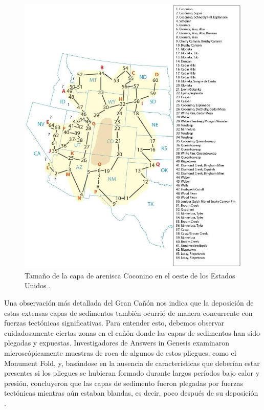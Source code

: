\documentclass[10pt,twocolumn,letterpaper]{article}
\begin{document}
\begin{figure}[t]

\begin{center}
   \includegraphics[width=1\linewidth]{coconino.jpg}
\end{center}
   \caption{Tamaño de la capa de arenisca Coconino en el oeste de los Estados Unidos \cite{21}.}
\label{fig:3}
\label{fig:onecol}
\end{figure}

Una observación más detallada del Gran Cañón nos indica que la deposición de estas extensas capas de sedimentos también ocurrió de manera concurrente con fuerzas tectónicas significativas. Para entender esto, debemos observar cuidadosamente ciertas zonas en el cañón donde las capas de sedimentos han sido plegadas y expuestas. Investigadores de Answers in Genesis \cite{42} examinaron microscópicamente muestras de roca de algunos de estos pliegues, como el Monument Fold, y, basándose en la ausencia de características que deberían estar presentes si los pliegues se hubieran formado durante largos períodos bajo calor y presión, concluyeron que las capas de sedimento fueron plegadas por fuerzas tectónicas mientras aún estaban blandas, es decir, poco después de su deposición \cite{43}.
\end{document}
